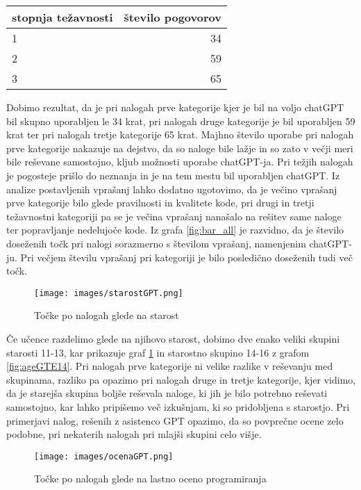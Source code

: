 \documentclass[a4paper,12pt,openright]{book}
\begin{document}
\begin{tabular}{|l|r|}
\hline
\textbf{stopnja težavnosti} & \textbf{število pogovorov} \\
\hline
1 & 34 \\
\hline
2 & 59 \\
\hline
3 & 65 \\
\hline
\end{tabular}
\newline
\newline
Dobimo rezultat, da je pri nalogah prve kategorije kjer je bil na voljo chatGPT bil skupno uporabljen le 34 krat, pri nalogah druge kategorije je bil uporabljen 59 krat ter pri nalogah tretje kategorije 65 krat. Majhno število uporabe pri nalogah prve kategorije nakazuje na dejstvo, da so naloge bile lažje in so zato v večji meri bile reševane samostojno, kljub možnosti uporabe chatGPT-ja. Pri težjih nalogah je pogosteje prišlo do neznanja in je na tem mestu bil uporabljen chatGPT. Iz analize postavljenih vprašanj lahko dodatno ugotovimo, da je večino vprašanj prve kategorije bilo glede pravilnosti in kvalitete kode, pri drugi in tretji težavnostni kategoriji pa se je večina vprašanj nanašalo na rešitev same naloge ter popravljanje nedelujoče kode.
Iz grafa \ref{fig:bar_all} je razvidno, da je število doseženih točk pri nalogi sorazmerno s številom vprašanj, namenjenim chatGPT-ju. Pri večjem številu vprašanj pri kategoriji je bilo posledično doseženih tudi več točk. 

\pagebreak
\begin{figure}[H]
    \centering
    \texttt{[image: images/starostGPT.png]}
    \caption{Točke po nalogah glede na starost}
    \label{fig:ageLT14}
\end{figure}


Če učence razdelimo glede na njihovo starost, dobimo dve enako veliki skupini starosti 11-13, kar prikazuje graf \ref{fig:ageLT14} in starostno skupino 14-16 z grafom \ref{fig:ageGTE14}. Pri nalogah prve kategorije ni velike razlike v reševanju med skupinama, razliko pa opazimo pri nalogah druge in tretje kategorije, kjer vidimo, da je starejša skupina boljše reševala naloge, ki jih je bilo potrebno reševati samostojno, kar lahko pripišemo več izkušnjam, ki so pridobljena s starostjo. Pri primerjavi nalog, rešenih z asistenco GPT opazimo, da so povprečne ocene zelo podobne, pri nekaterih nalogah pri mlajši skupini celo višje.

\pagebreak

\begin{figure}[H]
    \centering
    \texttt{[image: images/ocenaGPT.png]}
    \caption{Točke po nalogah glede na lastno oceno programiranja}
    \label{fig:ocenaLTE13}
\end{figure}
\end{document}
